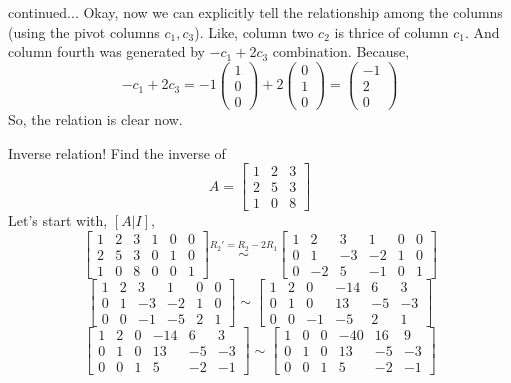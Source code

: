 \documentclass[11pt]{beamer}
\theoremstyle{plain}
\begin{document}
\begin{frame}{continued...}
 Okay, now we can explicitly tell the relationship among the columns (using the pivot columns $c_1,c_3$). Like,  column two $c_2$ is thrice of column $c_1$. And column fourth was generated by $-c_1+2c_3$ combination. Because,
$$
-c_1+2c_3=-1\begin{pmatrix}
    1\\0\\0
\end{pmatrix}+2\begin{pmatrix}
    0\\1\\0
\end{pmatrix}=\begin{pmatrix}
    -1\\2\\0
\end{pmatrix}
$$
So, the relation is clear now.   
\end{frame}
\begin{frame}{Inverse relation!}
    Find the inverse of $$A=\begin{bmatrix}
        1&2&3\\
        2&5&3\\
        1&0&8
    \end{bmatrix}$$
Let's start with, $[A|I]$, 
$$\left[\begin{array}{ccc|ccc}
        1&2&3&1&0&0\\
        2&5&3&0&1&0\\
        1&0&8&0&0&1
\end{array}\right]\stackrel{R_2'=R_2-2R_1}{\sim} \left[\begin{array}{ccc|ccc}
        1&2&3&1&0&0\\
        0&1&-3&-2&1&0\\
        0&-2&5&-1&0&1
\end{array}\right]$$
$$\left[\begin{array}{ccc|ccc}
        1&2&3&1&0&0\\
        0&1&-3&-2&1&0\\
        0&0&-1&-5&2&1
\end{array}\right]\sim\left[\begin{array}{ccc|ccc}
        1&2&0&-14&6&3\\
        0&1&0&13&-5&-3\\
        0&0&-1&-5&2&1
\end{array}\right]$$
$$\left[\begin{array}{ccc|ccc}
        1&2&0&-14&6&3\\
        0&1&0&13&-5&-3\\
        0&0&1&5&-2&-1
\end{array}\right]\sim\left[\begin{array}{ccc|ccc}
        1&0&0&-40&16&9\\
        0&1&0&13&-5&-3\\
        0&0&1&5&-2&-1
\end{array}\right]$$
\end{frame}
\end{document}
